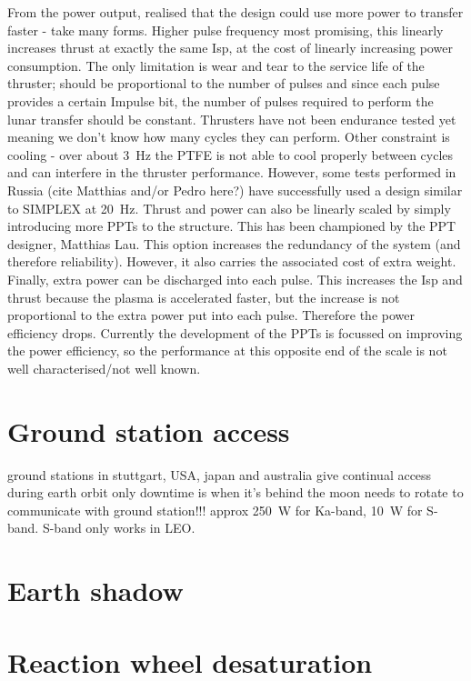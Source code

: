 From the power output, realised that the design could use more power to transfer faster - take many forms. Higher pulse frequency most promising, this linearly increases thrust at exactly the same Isp, at the cost of linearly increasing power consumption. The only limitation is wear and tear to the service life of the thruster; should be proportional to the number of pulses and since each pulse provides a certain Impulse bit, the number of pulses required to perform the lunar transfer should be constant. Thrusters have not been endurance tested yet meaning we don't know how many cycles they can perform. Other constraint is cooling - over about 3~Hz the PTFE is not able to cool properly between cycles and can interfere in the thruster performance. However, some tests performed in Russia (cite Matthias and/or Pedro here?) have successfully used a design similar to SIMPLEX at 20~Hz.
Thrust and power can also be linearly scaled by simply introducing more PPTs to the structure. This has been championed by the PPT designer, Matthias Lau. This option increases the redundancy of the system (and therefore reliability). However, it also carries the associated cost of extra weight.
Finally, extra power can be discharged into each pulse. This increases the Isp and thrust because the plasma is accelerated faster, but the increase is not proportional to the extra power put into each pulse. Therefore the power efficiency drops. Currently the development of the PPTs is focussed on improving the power efficiency, so the performance at this opposite end of the scale is not well characterised/not well known.

\section{Ground station access}
ground stations in stuttgart, USA, japan and australia give continual access during earth orbit
only downtime is when it's behind the moon
needs to rotate to communicate with ground station!!!
approx 250~W for Ka-band, 10~W for S-band. S-band only works in LEO.

\section{Earth shadow}

\section{Reaction wheel desaturation}

